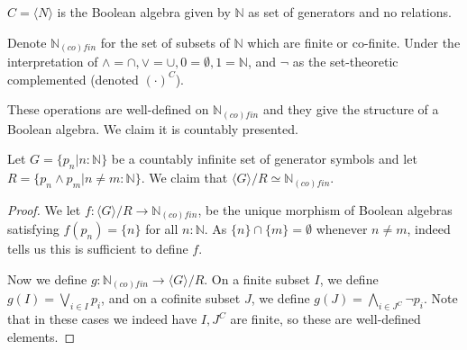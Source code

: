 \documentclass{../util/zariski-small}
\begin{document}
\begin{example}\label{ExampleBAunderCantor}
  $C = \langle N \rangle $ is the Boolean algebra given by $\mathbb N$ as set of generators and no relations. 
\end{example}
\begin{example}\label{ExampleBAunderNinfty}
  Denote $\mathbb N_{(co)fin}$ for the set of subsets of $\mathbb N$ which are finite or co-finite. 
  Under the interpretation of $\wedge = \cap , \vee = \cup, 0 = \emptyset, 1 = \mathbb N$, and $\neg$ 
  as the set-theoretic complemented (denoted $(\cdot)^C$). 

  These operations are well-defined on $\mathbb N_{(co)fin}$ 
  and they give the structure of a Boolean algebra.
  We claim it is countably presented. 

  Let $G = \{p_n| n:\mathbb N\} $ be a countably infinite set of generator symbols and let 
  $R = \{ p_n \wedge p_m | n\neq m :\mathbb N \}$. 
  We claim that $\langle G \rangle / R \simeq \mathbb N_{(co)fin}$. 

\begin{proof}
  We let $f:\langle G \rangle / R \to \mathbb N_{(co)fin}$, be the unique morphism of Boolean algebras 
  satisfying $f(p_n) = \{n\}$ for all $n:\mathbb N$. As $\{n\} \cap \{m\} = \emptyset$ whenever $n\neq m$, 
   indeed tells us this is sufficient to define $f$. 

  Now we define $g:\mathbb N_{(co)fin} \to \langle G \rangle / R$. 
  On a finite subset $I$, we define $g(I) = \bigvee_{i\in I} p_i$, 
  and on a cofinite subset $J$, we define $g(J) = \bigwedge _{i \in J^C} \neg p_i$. 
  Note that in these cases we indeed have $I,J^C$ are finite, so these are well-defined elements. 


\end{proof}
\end{example}
\end{document}
